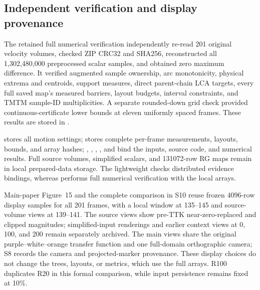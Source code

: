 \subsection{Independent verification and display provenance}
The retained full numerical verification independently re-read 201 original velocity volumes, checked ZIP CRC32 and SHA256, reconstructed all 1,302,480,000 preprocessed scalar samples, and obtained zero maximum difference. It verified augmented sample ownership, arc monotonicity, physical extrema and centroids, support measures, direct parent-chain LCA targets, every full saved map's measured barriers, layout budgets, interval constraints, and TMTM sample-ID multiplicities. A separate rounded-down grid check provided continuous-certificate lower bounds at eleven uniformly spaced frames. These results are stored in .

 stores all motion settings;  stores complete per-frame measurements, layouts, bounds, and array hashes; , , , , and  bind the inputs, source code, and numerical results. Full source volumes, simplified scalars, and 131072-row RG maps remain in local prepared-data storage. The lightweight  checks distributed evidence bindings, whereas  performs full numerical verification with the local arrays.

Main-paper Figure~15 and the complete comparison in S10 reuse frozen 4096-row display samples for all 201 frames, with a local window at 135--145 and source-volume views at 139--141. The source views show pre-TTK near-zero-replaced and clipped magnitudes; simplified-input renderings and earlier context views at 0, 100, and 200 remain separately archived. The main views share the original purple--white--orange transfer function and one full-domain orthographic camera; S8 records the camera and projected-marker provenance. These display choices do not change the trees, layouts, or metrics, which use the full arrays. R100 duplicates R20 in this formal comparison, while input persistence remains fixed at 10\%.


